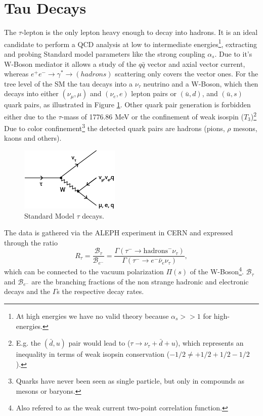 
\section{Tau Decays}\label{tauDecays}
The $\tau$-lepton is the only lepton heavy enough to decay into hadrons. It is an ideal candidate to perform a QCD analysis at low to intermediate energies\footnote{At high energies we have no valid theory because $\alpha_s>>1$ for high-energies.}, extracting and probing Standard model parameters like the strong coupling $\alpha_s$. Due to it's W-Boson mediator it allows a study of the $q\bar q$ vector and axial vector current, whereas $e^+e^-\to\gamma^*\to (hadrons)$ scattering only covers the vector ones.
For the tree level of the SM the tau decays into a $\nu_\tau$ neutrino and a W-Boson, which then decays into either $(\nu_\mu, \mu)$ and $(\nu_e, e)$ lepton pairs or $(\bar u, d)$, and $(\bar u, s)$ quark pairs, as illustrated in Figure \ref{fig:tauDecay}. Other quark pair generation is forbidden either due to the $\tau$-mass of 1776.86 MeV \cite{Olive2014} or the confinement of weak isospin ($T_3$)\footnote{E.g. the $(\bar d, u)$ pair would lead to ($\tau \to \nu_\tau + \bar d + u$), which represents an inequality in terms of weak isopsin conservation ($-1/2 \neq +1/2 + 1/2 - 1/2$).} Due to color confinement\footnote{Quarks have never been seen as single particle, but only in compounds as mesons or baryons.} the detected quark pairs are hadrons (pions, $\rho$ mesons, kaons and others).

\begin{figure}[h]
	\centering
	\includegraphics{img/tauDecay.png}
	\caption{Standard Model $\tau$ decays.}
	\label{fig:tauDecay}
\end{figure}

The data is gathered via the ALEPH experiment in CERN and expressed through the ratio
\begin{equation}
  R_\tau = \frac{\mathcal{B}_\tau}{\mathcal{B}_{e^-}} = \frac{\Gamma(\tau^- \to \text{hadrons}^- \nu_\tau)}{\Gamma(\tau^- \to e^- \bar \nu_e \nu_\tau)},
\end{equation}		
which can be connected to the vacuum polarization $\Pi(s)$ of the W-Boson\footnote{Also refered to as the weak current two-point correlation function.}. $\mathcal{B}_\tau$ and $\mathcal{B}_{e^-}$ are the branching fractions of the non strange hadronic and electronic decays and the $\Gamma$s the respective decay rates.

